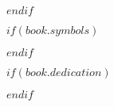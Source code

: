 

$endif$

$if(book.symbols)$



$endif$

$if(book.dedication)$

\dedicatory{} 

$endif$


\mainmatter %

\pagestyle{thesis} %
